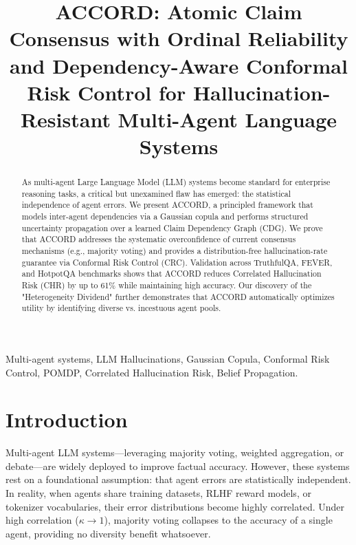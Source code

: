 \documentclass[conference]{IEEEtran}
\begin{document}
\title{ACCORD: Atomic Claim Consensus with Ordinal Reliability and Dependency-Aware Conformal Risk Control for Hallucination-Resistant Multi-Agent Language Systems}

\author{
}

\maketitle

\begin{abstract}
As multi-agent Large Language Model (LLM) systems become standard for enterprise reasoning tasks, a critical but unexamined flaw has emerged: the statistical independence of agent errors. We present ACCORD, a principled framework that models inter-agent dependencies via a Gaussian copula and performs structured uncertainty propagation over a learned Claim Dependency Graph (CDG). We prove that ACCORD addresses the systematic overconfidence of current consensus mechanisms (e.g., majority voting) and provides a distribution-free hallucination-rate guarantee via Conformal Risk Control (CRC). Validation across TruthfulQA, FEVER, and HotpotQA benchmarks shows that ACCORD reduces Correlated Hallucination Risk (CHR) by up to 61\% while maintaining high accuracy. Our discovery of the "Heterogeneity Dividend" further demonstrates that ACCORD automatically optimizes utility by identifying diverse vs. incestuous agent pools.
\end{abstract}

\begin{IEEEkeywords}
Multi-agent systems, LLM Hallucinations, Gaussian Copula, Conformal Risk Control, POMDP, Correlated Hallucination Risk, Belief Propagation.
\end{IEEEkeywords}

\section{Introduction}
Multi-agent LLM systems—leveraging majority voting, weighted aggregation, or debate—are widely deployed to improve factual accuracy. However, these systems rest on a foundational assumption: that agent errors are statistically independent. In reality, when agents share training datasets, RLHF reward models, or tokenizer vocabularies, their error distributions become highly correlated. Under high correlation ($\kappa \to 1$), majority voting collapses to the accuracy of a single agent, providing no diversity benefit whatsoever.
\end{document}
